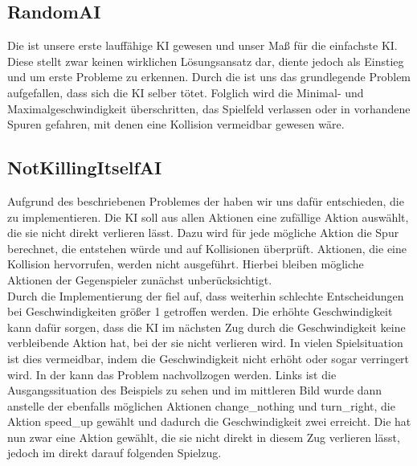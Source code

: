 \subsection{RandomAI}
\label{subsec:random-ai}

Die  ist unsere erste lauffähige KI gewesen und unser Maß für die einfachste \ac{KI}.
Diese stellt zwar keinen wirklichen Lösungsansatz dar, diente jedoch als Einstieg und um erste Probleme zu erkennen.
Durch die  ist uns das grundlegende Problem aufgefallen, dass sich die \ac{KI} selber tötet.
Folglich wird die Minimal- und Maximalgeschwindigkeit überschritten, das Spielfeld verlassen oder in vorhandene Spuren
gefahren, mit denen eine Kollision vermeidbar gewesen wäre.

\subsection{NotKillingItselfAI}
\label{subsec:notkillingitself-ai}

Aufgrund des beschriebenen Problemes der  haben wir uns dafür entschieden, die 
zu implementieren.
Die \ac{KI} soll aus allen Aktionen eine zufällige Aktion auswählt, die sie nicht direkt verlieren lässt.
Dazu wird für jede mögliche Aktion die Spur berechnet, die entstehen würde und auf Kollisionen überprüft.
Aktionen, die eine Kollision hervorrufen, werden nicht ausgeführt.
Hierbei bleiben mögliche Aktionen der Gegenspieler zunächst unberücksichtigt. \\

Durch die Implementierung der  fiel auf, dass weiterhin schlechte Entscheidungen bei
Geschwindigkeiten größer 1 getroffen werden.
Die erhöhte Geschwindigkeit kann dafür sorgen, dass die \ac{KI} im nächsten Zug durch die Geschwindigkeit keine
verbleibende Aktion hat, bei der sie nicht verlieren wird.
In vielen Spielsituation ist dies vermeidbar, indem die Geschwindigkeit nicht erhöht oder sogar verringert wird.
In der  kann das Problem nachvollzogen werden.
Links ist die Ausgangssituation des Beispiels zu sehen und im mittleren Bild wurde dann anstelle der ebenfalls möglichen
Aktionen change\_nothing und turn\_right, die Aktion speed\_up gewählt und dadurch die Geschwindigkeit zwei erreicht.
Die  hat nun zwar eine Aktion gewählt, die sie nicht direkt in diesem Zug verlieren lässt,
jedoch im direkt darauf folgenden Spielzug.

